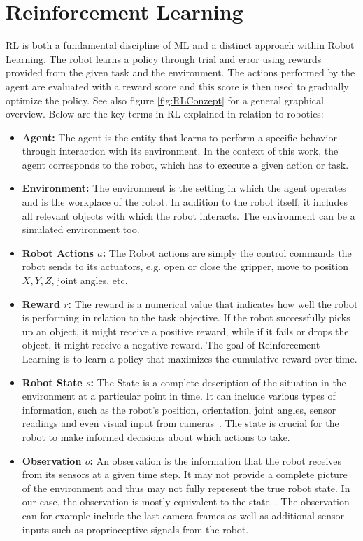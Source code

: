 \section{Reinforcement Learning} \label{sec:ReinforcementLearning}
\ac{RL} is both a fundamental discipline of \ac{ML} and a distinct approach within Robot Learning.
The robot learns a policy through trial and error using rewards provided from the given task and the environment. The actions performed by the agent are evaluated with a reward score and this score is then used to gradually optimize the policy. See also figure \ref{fig:RLConzept} for a general graphical overview. Below are the key terms in \ac{RL} explained in relation to robotics: 
\begin{itemize}
	\item \textbf{Agent:} The agent is the entity that learns to perform a specific behavior through interaction with its environment. In the context of this work, the agent corresponds to the robot, which has to execute a given action or task. 
	\item \textbf{Environment:} The environment is the setting in which the agent operates and is the workplace of the robot. In addition to the robot itself, it includes all relevant objects with which the robot interacts. The environment can be a simulated environment too.
	\item \textbf{Robot Actions $a$:} The Robot actions are simply the control commands the robot sends to its actuators, e.g. open or close the gripper, move to position $X,Y,Z$, joint angles, etc.
	\item \textbf{Reward $r$:} The reward is a numerical value that indicates how well the robot is performing in relation to the task objective. If the robot successfully picks up an object, it might receive a positive reward, while if it fails or drops the object, it might receive a negative reward. The goal of Reinforcement Learning is to learn a policy that maximizes the cumulative reward over time.
	\item \textbf{Robot State $s$:} The State is a complete description of the situation in the environment at a particular point in time. 
	It can include various types of information, such as the robot's position, orientation, joint angles, sensor readings and even visual input from cameras~\cite{walkerastroActionSpaceState2024}. The state is crucial for the robot to make informed decisions about which actions to take.
	\item \textbf{Observation $o$:} An observation is the information that the robot receives from its sensors at a given time step. It may not provide a complete picture of the environment and thus may not fully represent the true robot state. In our case, the observation is mostly equivalent to the state~\cite{walkerastroActionSpaceState2024}. The observation can for example include the last camera frames as well as additional sensor inputs such as proprioceptive signals from the robot.

\end{itemize}
